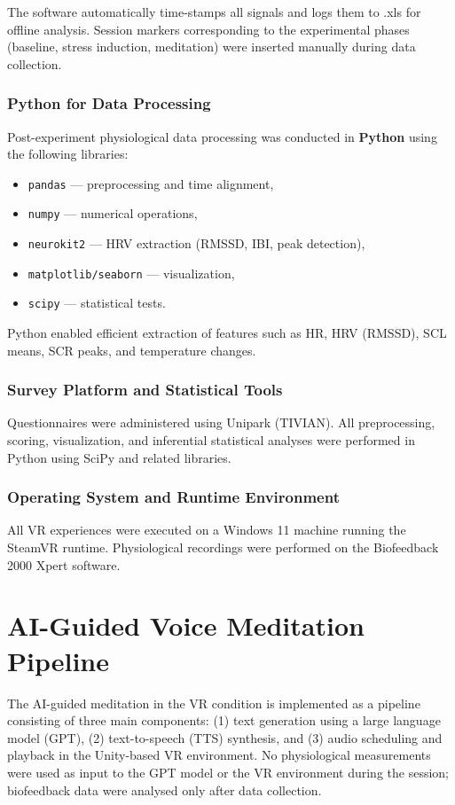 The software automatically time-stamps all signals and logs them to .xls for offline analysis. Session markers corresponding to the experimental phases (baseline, stress induction, meditation) were inserted manually during data collection.

\subsubsection{Python for Data Processing}

Post-experiment physiological data processing was conducted in \textbf{Python} using the following libraries:
\begin{itemize}
    \item \texttt{pandas} — preprocessing and time alignment,
    \item \texttt{numpy} — numerical operations,
    \item \texttt{neurokit2} — HRV extraction (RMSSD, IBI, peak detection),
    \item \texttt{matplotlib/seaborn} — visualization,
    \item \texttt{scipy} — statistical tests.
\end{itemize}

Python enabled efficient extraction of features such as HR, HRV (RMSSD), SCL means, SCR peaks, and temperature changes.

\subsubsection{Survey Platform and Statistical Tools}
Questionnaires were administered using Unipark (TIVIAN). All preprocessing, scoring, visualization, and inferential statistical analyses were performed in Python using SciPy and related libraries.


\subsubsection{Operating System and Runtime Environment}

All VR experiences were executed on a Windows 11 machine running the SteamVR runtime. Physiological recordings were performed on the Biofeedback 2000 Xpert software.

\section{AI-Guided Voice Meditation Pipeline}
\label{sec:ai-meditation-pipeline}
The AI-guided meditation in the VR condition is implemented as a pipeline consisting of three main components: (1) text generation using a large language model (GPT), (2) text-to-speech (TTS) synthesis, and (3) audio scheduling and playback in the Unity-based VR environment. No physiological measurements were used as input to the GPT model or the VR environment during the session; biofeedback data were analysed only after data collection.


